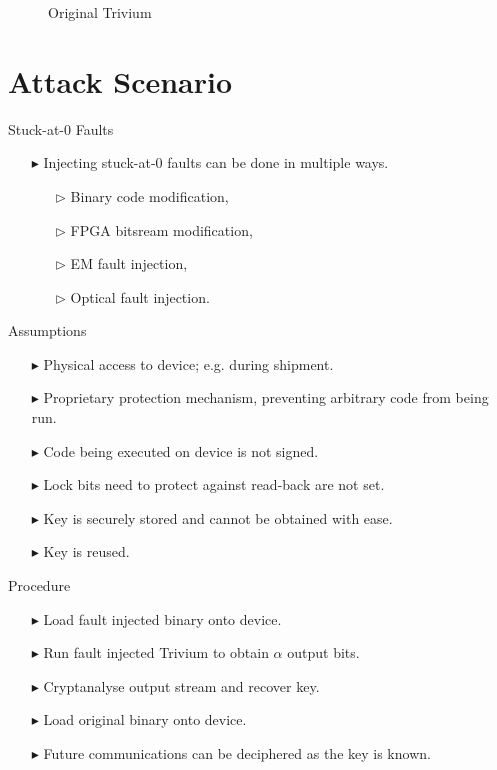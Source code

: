 \documentclass[conference]{IEEEtran}
\begin{document}
\begin{figure}
\centering

\caption{Original Trivium}
\label{fig:original}
\end{figure}

\section{Attack Scenario}


Stuck-at-0 Faults
\begin{itemize}
\item[$\blacktriangleright$] Injecting stuck-at-0 faults can be done in multiple ways.
\begin{itemize}
\item[$\triangleright$] Binary code modification,
\item[$\triangleright$] FPGA bitsream modification,
\item[$\triangleright$] EM fault injection, 
\item[$\triangleright$] Optical fault injection. 
\end{itemize}
\end{itemize}

Assumptions
\begin{itemize}
\item[$\blacktriangleright$] Physical access to device; e.g. during shipment.
\item[$\blacktriangleright$] Proprietary protection mechanism, preventing arbitrary code from being run.
\item[$\blacktriangleright$] Code being executed on device is not signed.
\item[$\blacktriangleright$] Lock bits need to protect against read-back are not set.
\item[$\blacktriangleright$] Key is securely stored and cannot be obtained with ease.
\item[$\blacktriangleright$] Key is reused.
\end{itemize}

Procedure
\begin{itemize}
\item[$\blacktriangleright$] Load fault injected binary onto device.
\item[$\blacktriangleright$] Run fault injected Trivium to obtain $\alpha$ output bits.
\item[$\blacktriangleright$] Cryptanalyse output stream and recover key.
\item[$\blacktriangleright$] Load original binary onto device.
\item[$\blacktriangleright$] Future communications can be deciphered as the key is known.
\end{itemize}
\end{document}
